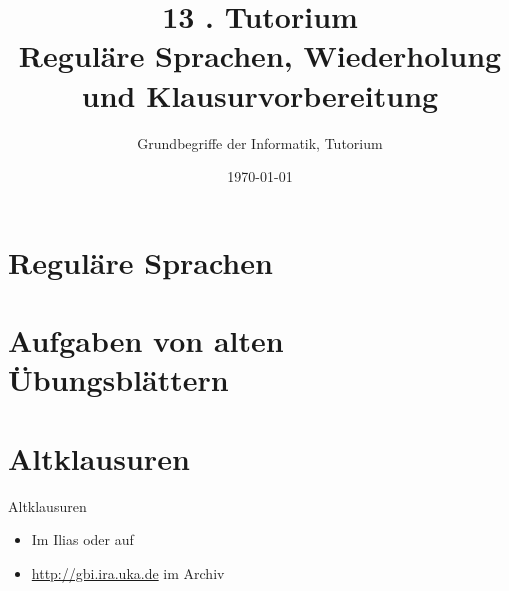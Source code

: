 




\title[\Moritz{Reguläre Sprachen und }Wiederholung]{13 . Tutorium\\ Reguläre Sprachen, Wiederholung und Klausurvorbereitung}
\subtitle{Grundbegriffe der Informatik, Tutorium \hashtag\mytutnumber}
\date{\today}


\titleframe
\roadmap



	
\section{Reguläre Sprachen}




\section{Aufgaben von alten Übungsblättern}



\section{Altklausuren}
\begin{frame}{Altklausuren}
    \begin{itemize}
    	\item Im Ilias oder auf 
    	\item \url{http://gbi.ira.uka.de} im Archiv
    \end{itemize}
\end{frame}

\section{}

